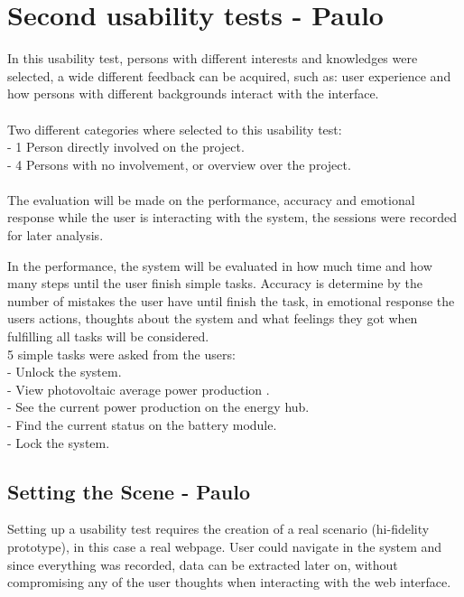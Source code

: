 \section{Second usability tests - Paulo}

In this usability test, persons with different interests and knowledges were selected, a wide different feedback can be acquired, such as: user experience and how persons with different backgrounds interact with the interface.
\\
\\Two different categories where selected to this usability test:\\
- 1 Person directly involved on the project.\\
- 4 Persons with no involvement, or overview over the project.\\
\\

The evaluation will be made on the performance, accuracy and emotional response while the user is interacting with the system, the sessions were recorded for later analysis.

In the performance, the system will be evaluated in how much time and how many steps until the user finish simple tasks. Accuracy is determine by the number of mistakes the user have until finish the task, in emotional response the users actions, thoughts about the system and what feelings they got when fulfilling all tasks will be considered.
\\
5 simple tasks were asked from the users:\\
- Unlock the system.\\
- View photovoltaic average power production .\\
- See the current power production on the energy hub.\\
- Find the current status on the battery module.\\
- Lock the system.\\

\subsection{Setting the Scene - Paulo}
Setting up a usability test requires the creation of a real scenario (hi-fidelity prototype), in this case a real webpage. User could navigate in the system and since everything was recorded, data can be extracted later on, without compromising any of the user thoughts when interacting with the web interface.

